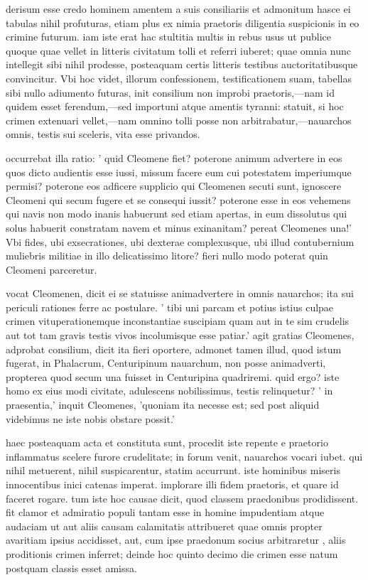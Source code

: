  derisum esse credo hominem amentem a suis consiliariis et admonitum hasce ei tabulas nihil profuturas, etiam plus ex nimia praetoris diligentia suspicionis in eo crimine futurum. iam iste erat hac stultitia multis in rebus usus ut publice quoque quae vellet in litteris civitatum tolli et referri iuberet; quae omnia nunc intellegit sibi nihil prodesse, posteaquam certis litteris testibus auctoritatibusque convincitur. Vbi hoc videt, illorum confessionem, testificationem suam, tabellas sibi nullo adiumento futuras, init consilium non improbi praetoris,—nam id quidem esset ferendum,—sed importuni atque amentis tyranni: statuit, si hoc crimen extenuari vellet,—nam omnino tolli posse non arbitrabatur,—nauarchos omnis, testis sui sceleris, vita esse privandos.

 occurrebat illa ratio: ' quid Cleomene fiet? poterone animum advertere in eos quos dicto audientis esse iussi, missum facere eum cui potestatem imperiumque permisi? poterone eos adficere supplicio qui Cleomenen secuti sunt, ignoscere Cleomeni qui secum fugere et se consequi iussit? poterone esse in eos vehemens qui navis non modo inanis habuerunt sed etiam apertas, in eum dissolutus qui solus habuerit constratam navem et minus exinanitam? pereat Cleomenes una!' Vbi fides, ubi exsecrationes, ubi dexterae complexusque, ubi illud contubernium muliebris militiae in illo delicatissimo litore? fieri nullo modo poterat quin Cleomeni parceretur.

 vocat Cleomenen, dicit ei se statuisse animadvertere in omnis nauarchos; ita sui periculi rationes ferre ac postulare. ' tibi uni parcam et potius istius culpae crimen vituperationemque inconstantiae suscipiam quam aut in te sim crudelis aut tot tam gravis testis vivos incolumisque esse patiar.' agit gratias Cleomenes, adprobat consilium, dicit ita fieri oportere, admonet tamen illud, quod istum fugerat, in Phalacrum, Centuripinum nauarchum, non posse animadverti, propterea quod secum una fuisset in Centuripina quadriremi. quid ergo? iste homo ex eius modi civitate, adulescens nobilissimus, testis relinquetur? ' in praesentia,' inquit Cleomenes, 'quoniam ita necesse est; sed post aliquid videbimus ne iste nobis obstare possit.'

 haec posteaquam acta et constituta sunt, procedit iste repente e praetorio inflammatus scelere furore crudelitate; in forum venit, nauarchos vocari iubet. qui nihil metuerent, nihil suspicarentur, statim accurrunt. iste hominibus miseris innocentibus inici catenas imperat. implorare illi fidem praetoris, et quare id faceret rogare. tum iste hoc causae dicit, quod classem praedonibus prodidissent. fit clamor et admiratio populi tantam esse in homine impudentiam atque audaciam ut aut aliis causam calamitatis attribueret quae omnis propter avaritiam ipsius accidisset, aut, cum ipse praedonum socius arbitraretur , aliis proditionis crimen inferret; deinde hoc quinto decimo die crimen esse natum postquam classis esset amissa.

